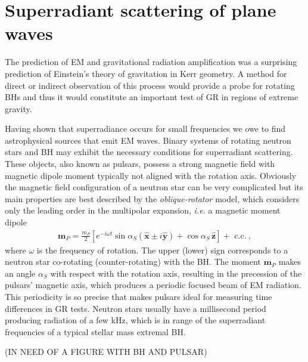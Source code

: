 
\chapter{Superradiant scattering of plane waves} %
\label{Chapter5}

The prediction of EM and gravitational radiation amplification was a surprising prediction of Einstein's theory of gravitation in Kerr geometry.
A method for direct or indirect observation of this process would provide a probe for rotating BHs and thus it would constitute an important test of GR in regions of extreme gravity.

Having shown that superradiance occurs for small frequencies we owe to find astrophysical sources that emit EM waves.
Binary systems of rotating neutron stars and BH may exhibit the necessary conditions for superradiant scattering.
These objects, also known as pulsars, possess a strong magnetic field with magnetic dipole moment typically not aligned with the rotation axis.
Obviously the magnetic field configuration of a neutron star can be very complicated but its main properties are best described by the \emph{oblique-rotator} model, which considers only the leading order in the multipolar expansion, \emph{i.e.} a magnetic moment dipole
\begin{align}
    \mathbf{m}_P = \frac{m_P}{2} \left[ e^{-i \omega t} \sin\alpha_S ( \mathbf{\hat{x}} \pm i \mathbf{\hat{y}}) + \cos\alpha_S \,\mathbf{\hat{z}} \right] + \text{ c.c.} ~,
\end{align}
where $\omega$ is the frequency of rotation.
The upper (lower) sign corresponds to a neutron star co-rotating (counter-rotating) with the BH.
The moment $\mathbf{m}_P$ makes an angle $\alpha_S$ with respect with the rotation axis, resulting in the precession of the pulsars' magnetic axis, which produces a periodic focused beam of EM radiation.
This periodicity is so precise that makes pulsars ideal for measuring time differences in GR tests.
Neutron stars usually have a millisecond period producing radiation of a few kHz, which is in range of the superradiant frequencies of a typical stellar mass extremal BH.  

(IN NEED OF A FIGURE WITH BH AND PULSAR)

